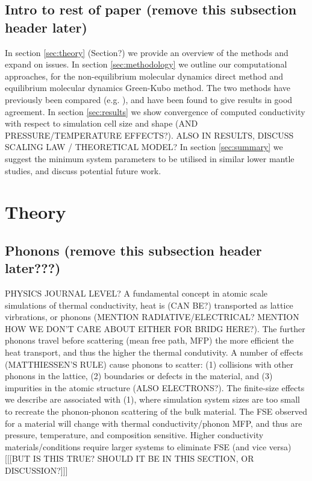 \documentclass[%
preprint,                                  %
nofootinbib,
 amsmath,amssymb,
 aps,
]{revtex4-1}
\begin{document}








\subsection{\label{sec:intro.end}Intro to rest of paper (remove this subsection header later)}

In section \ref{sec:theory} (Section?) we provide an overview of the methods and expand on issues.
In section \ref{sec:methodology} we outline our computational approaches, for the non-equilibrium molecular dynamics direct method and equilibrium molecular dynamics Green-Kubo method. The two methods have previously been compared (e.g. \citet{Schelling2002}), and have been found to give results in good agreement. 
In section \ref{sec:results} we show convergence of computed conductivity with respect to simulation cell size and shape (AND PRESSURE/TEMPERATURE EFFECTS?). ALSO IN RESULTS, DISCUSS SCALING LAW / THEORETICAL MODEL?
In section \ref{sec:summary} we suggest the minimum system parameters to be utilised in similar lower mantle studies, and discuss potential future work. 




\section{\label{sec:theory}Theory}

\subsection{\label{sec:intro.phon}Phonons (remove this subsection header later???)}

PHYSICS JOURNAL LEVEL? 
A fundamental concept in atomic scale simulations of thermal conductivity, heat is (CAN BE?) transported as lattice virbrations, or phonons (MENTION RADIATIVE/ELECTRICAL? MENTION HOW WE DON'T CARE ABOUT EITHER FOR BRIDG HERE?). The further phonons travel before scattering (mean free path, MFP) the more efficient the heat transport, and thus the higher the thermal condutivity. A number of effects (MATTHIESSEN'S RULE) cause phonons to scatter: (1) collisions with other phonons in the lattice, (2) boundaries or defects in the material, and (3) impurities in the atomic structure (ALSO ELECTRONS?). The finite-size effects we describe are associated with (1), where simulation system sizes are too small to recreate the phonon-phonon scattering of the bulk material. The FSE observed for a material will change with thermal conductivity/phonon MFP, and thus are pressure, temperature, and composition sensitive. Higher conductivity materials/conditions require larger systems to eliminate FSE (and vice versa) [[[BUT IS THIS TRUE? SHOULD IT BE IN THIS SECTION, OR DISCUSSION?]]]
\end{document}
